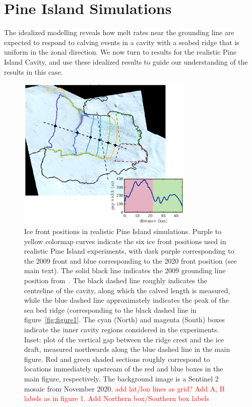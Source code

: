 \documentclass[draft]{agujournal2019}
\newcommand{\red}[1]{\textcolor{red}{#1}}
\begin{document}
\section{Pine Island Simulations}
The idealized modelling reveals how melt rates near the grounding line are expected to respond to calving events in a cavity with a seabed ridge that is uniform in the zonal direction. We now turn to results for the realistic Pine Island Cavity, and use these idealized results to guide our understanding of the results in this case. 

\begin{figure}
    \centering
    \includegraphics[width = 0.75\textwidth]{../make_figures/plots/figure10.eps}
    \caption{Ice front positions in realistic Pine Island simulations. Purple to yellow colormap curves indicate the six ice front positions used in realistic Pine Island experiments, with dark purple corresponding to the 2009 front and blue corresponding to the 2020 front position (see main text). The solid black line indicates the 2009 grounding line position from~\cite{Joughin2010GRL}. The black dashed line roughly indicates the centreline of the cavity, along which the calved length is measured, while the blue dashed line approximately indicates  the peak of the sea bed ridge (corresponding to the black dashed line in figure~\ref{fig:figure1}. The cyan (North) and magenta (South) boxes indicate the inner cavity regions considered in the experiments. Inset: plot of the vertical gap between the ridge crest and the ice draft, measured northwards along the blue dashed line in the main figure. Red and green shaded sections roughly correspond to locations immediately upstream of the red and blue boxes in the main figure, respectively. The background image is a Sentinel 2 mosaic from November 2020. \red{add lat/lon lines as grid? Add A, B labels as in figure 1. Add Northern box/Southern box labels}}
    \label{fig:figure10}
\end{figure}
\end{document}
